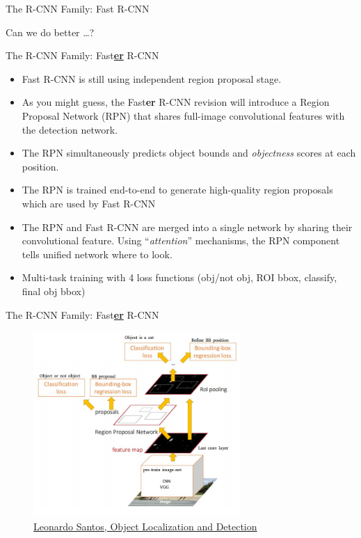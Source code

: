 \documentclass[handout]{beamer}
\begin{document}
\begin{frame}{The R-CNN Family: Fast R-CNN}
\begin{centering}
Can we do better \ldots?
\end{centering}
\end{frame}

\begin{frame}{The R-CNN Family: Fast\underline{\textbf{er}} R-CNN}
\begin{itemize}
\itemsep 0.6em
	\item<1->Fast R-CNN is still using independent region proposal stage.  
        \item<2->As you might guess, the Fast\textbf{er} R-CNN revision will introduce a Region Proposal Network (RPN) that shares full-image convolutional features with the detection network.
        \item<3->The RPN simultaneously predicts object bounds and \emph{objectness} scores at each position.
        \item<4->The RPN is trained end-to-end to generate high-quality region proposals which are used by Fast R-CNN 
        \item<5->The RPN and Fast R-CNN are merged into a single network by sharing their convolutional feature.  Using \enquote{\emph{attention}} mechanisms, the RPN component tells unified network where to look.
        \item<6->Multi-task training with 4 loss functions (obj/not obj, ROI bbox, classify, final obj bbox)
\end{itemize}
\end{frame}

\begin{frame}{The R-CNN Family: Fast\underline{\textbf{er}} R-CNN}
\begin{figure}
\centering
	\includegraphics[width=0.7\textwidth,keepaspectratio]{../media/faster-rcnn-arch.png}
	\caption{\href{https://leonardoaraujosantos.gitbooks.io/artificial-inteligence/content/object_localization_and_detection.html}{\color{blue}Leonardo Santos, Object Localization and Detection}}
\end{figure}
\end{frame}
\end{document}
